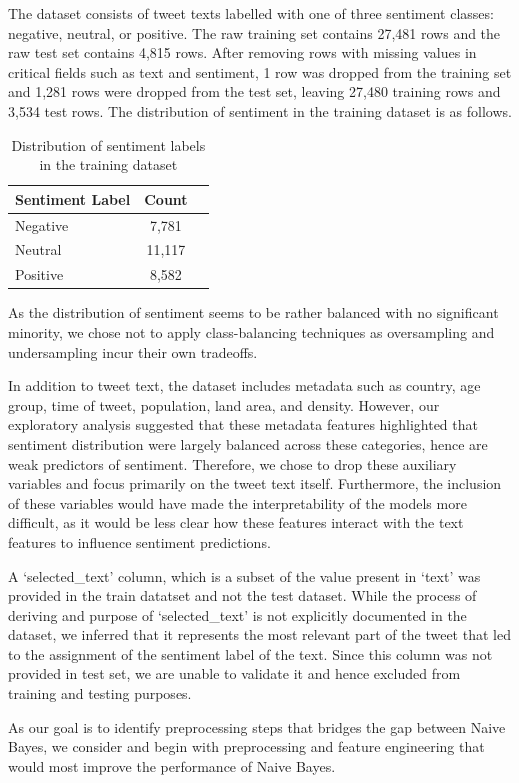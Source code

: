 \documentclass[11pt]{article}
\begin{document}
The dataset consists of tweet texts labelled with one of three sentiment classes: negative, neutral, or positive. 
The raw training set contains 27,481 rows and the raw test set contains 4,815 rows. 
After removing rows with missing values in critical fields such as text and sentiment, 1 row was dropped from the training set and 1,281 rows were dropped from the test set, leaving 27,480 training rows and 3,534 test rows. 
The distribution of sentiment in the training dataset is as follows.
\begin{table}[!ht]
\centering
\begin{tabular}{lcr}
\hline
\textbf{Sentiment Label} & \textbf{Count} \\
\hline
Negative & 7,781 \\
Neutral & 11,117 \\
Positive & 8,582 \\
\hline
\end{tabular}
\caption{Distribution of sentiment labels in the training dataset}
\end{table}
As the distribution of sentiment seems to be rather balanced with no significant minority, we chose not to apply class-balancing techniques as oversampling and undersampling incur their own tradeoffs.

In addition to tweet text, the dataset includes metadata such as country, age group, time of tweet, population, land area, and density. 
However, our exploratory analysis suggested that these metadata features highlighted that sentiment distribution were largely balanced across these categories, hence are weak predictors of sentiment. 
Therefore, we chose to drop these auxiliary variables and focus primarily on the tweet text itself. Furthermore, the inclusion of these variables would have made the interpretability of the models more difficult, as it would be less clear how these features interact with the text features to influence sentiment predictions.

A `selected\_text' column, which is a subset of the value present in `text' was provided in the train datatset and not the test dataset.
While the process of deriving and purpose of `selected\_text' is not explicitly documented in the dataset, we inferred that it represents the most relevant part of the tweet that led to the assignment of the sentiment label of the text. 
Since this column was not provided in test set, we are unable to validate it and hence excluded from training and testing purposes.

As our goal is to identify preprocessing steps that bridges the gap between Naive Bayes, we consider and begin with preprocessing and feature engineering that would most improve the performance of Naive Bayes.
\end{document}
